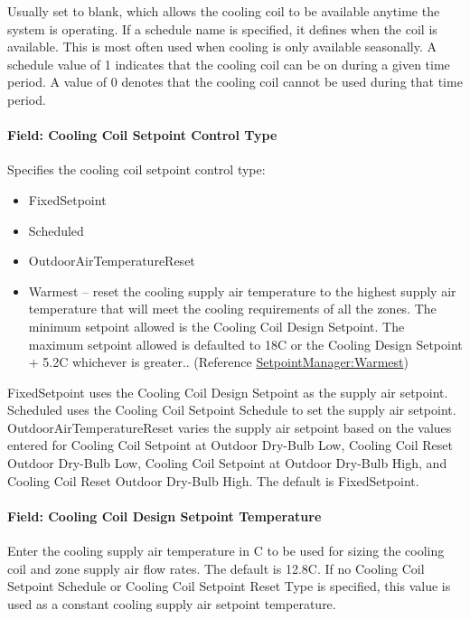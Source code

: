 Usually set to blank, which allows the cooling coil to be available anytime the system is operating. If a schedule name is specified, it defines when the coil is available. This is most often used when cooling is only available seasonally. A schedule value of 1 indicates that the cooling coil can be on during a given time period. A value of 0 denotes that the cooling coil cannot be used during that time period.

\paragraph{Field: Cooling Coil Setpoint Control Type}\label{field-cooling-coil-setpoint-control-type-1}

Specifies the cooling coil setpoint control type:

\begin{itemize}
\item
  FixedSetpoint
\item
  Scheduled
\item
  OutdoorAirTemperatureReset
\item
  Warmest -- reset the cooling supply air temperature to the highest supply air temperature that will meet the cooling requirements of all the zones. The minimum setpoint allowed is the Cooling Coil Design Setpoint. The maximum setpoint allowed is defaulted to 18C or the Cooling Design Setpoint + 5.2C whichever is greater.. (Reference \hyperref[setpointmanagerwarmest]{SetpointManager:Warmest})
\end{itemize}

FixedSetpoint uses the Cooling Coil Design Setpoint as the supply air setpoint. Scheduled uses the Cooling Coil Setpoint Schedule to set the supply air setpoint. OutdoorAirTemperatureReset varies the supply air setpoint based on the values entered for Cooling Coil Setpoint at Outdoor Dry-Bulb Low, Cooling Coil Reset Outdoor Dry-Bulb Low, Cooling Coil Setpoint at Outdoor Dry-Bulb High, and Cooling Coil Reset Outdoor Dry-Bulb High. The default is FixedSetpoint.

\paragraph{Field: Cooling Coil Design Setpoint Temperature}\label{field-cooling-coil-design-setpoint-temperature-1}

Enter the cooling supply air temperature in C to be used for sizing the cooling coil and zone supply air flow rates. The default is 12.8C. If no Cooling Coil Setpoint Schedule or Cooling Coil Setpoint Reset Type is specified, this value is used as a constant cooling supply air setpoint temperature.

